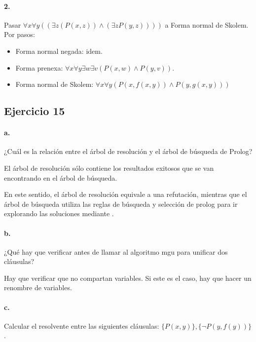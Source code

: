 \paragraph{2.}

Pasar $\forall x\forall y((\exists z (P(x,z))\land (\exists z P(y,z))))$ a Forma normal de Skolem. Por pasos:

\begin{itemize}
  \item Forma normal negada: idem.
  \item Forma prenexa: $\forall x\forall y\exists w\exists v (P(x,w)\land P(y,v))$.
  \item Forma normal de Skolem: $\forall x\forall y (P(x,f(x,y))\land P(y,g(x,y)))$
\end{itemize}

\subsection*{Ejercicio 15}

\paragraph{a.} ¿Cuál es la relación entre el árbol de resolución y el árbol de búsqueda de Prolog?

El árbol de resolución sólo contiene los resultados exitosos que se van encontrando en el árbol de búsqueda.

En este sentido, el árbol de resolución equivale a una refutación, mientras que el árbol de búsqueda utiliza las reglas de búsqueda y selección de prolog para ir explorando las soluciones mediante .


\paragraph{b.} ¿Qué hay que verificar antes de llamar al algoritmo mgu para unificar dos cláusulas?

Hay que verificar que no compartan variables. Si este es el caso, hay que hacer un renombre de variables.


\paragraph{c.} Calcular el resolvente entre las siguientes cláusulas: $\{P (x, y)\}, \{\lnot P (y, f (y))\}$.

